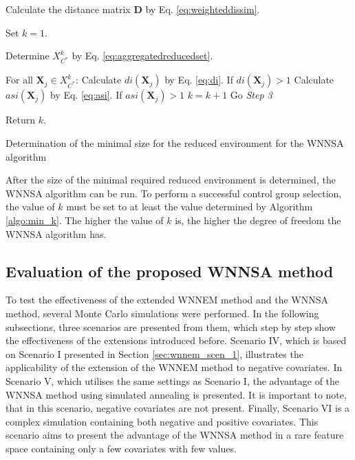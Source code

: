 		\begin{algorithm}
																
																
			Calculate the distance matrix $\textbf{D}$ by Eq. \ref{eq:weighteddissim}.
																
			Set $k=1$.
																
			Determine $X_{C^*}^k$ by Eq. \ref{eq:aggregatedreducedset}. 
																
			For all $\textbf{X}_j \in X_{C^*}^k$:
			\linebreak
			\text{\quad}
			Calculate $di(\textbf{X}_j)$ by Eq. \ref{eq:di}.
			\linebreak
			\text{\quad}
			If $di(\textbf{X}_j) > 1$
			\linebreak
			\text{\quad}\text{\quad}
			Calculate $asi(\textbf{X}_j)$ by Eq. \ref{eq:asi}.
			\linebreak
			\text{\quad}\text{\quad}
			If $asi(\textbf{X}_j) > 1$
			\linebreak
			\text{\quad}\text{\quad}\text{\quad}
			$k=k+1$
			\linebreak
			\text{\quad}\text{\quad}\text{\quad}
			Go \textit{Step 3}
															    
			Return $k$.
																
			\caption{Determination of the minimal size for the reduced environment for the WNNSA algorithm}
			\label{algo:min_k}
		\end{algorithm}
										
		After the size of the minimal required reduced environment is determined, the WNNSA algorithm can be run. To perform a successful control group selection, the value of $k$ must be set to at least the value determined by Algorithm \ref{algo:min_k}. The higher the value of $k$ is, the higher the degree of freedom the WNNSA algorithm has.
				         
		\subsection{Evaluation of the proposed WNNSA method}
		\label{sec:eval_wnnsa}
										
		To test the effectiveness of the extended WNNEM method and the WNNSA method, several Monte Carlo simulations were performed. In the following subsections, three scenarios are presented from them, which step by step show the effectiveness of the extensions introduced before. Scenario IV, which is based on Scenario I presented in Section \ref{sec:wnnem_scen_1}, illustrates the applicability of the extension of the WNNEM method to negative covariates. In Scenario V, which utilises the same settings as Scenario I, the advantage of the WNNSA method using simulated annealing is presented. It is important to note, that in this scenario, negative covariates are not present. Finally, Scenario VI is a complex simulation containing both negative and positive covariates. This scenario aims to present the advantage of the WNNSA method in a rare feature space containing only a few covariates with few values.
							
